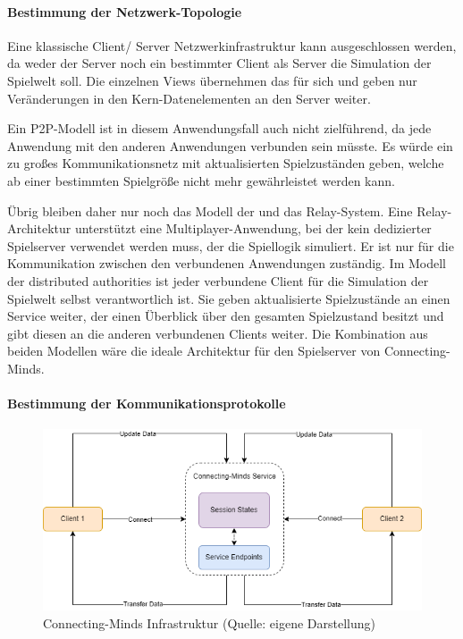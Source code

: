 \paragraph{Bestimmung der Netzwerk-Topologie}

Eine klassische Client/ Server Netzwerkinfrastruktur kann ausgeschlossen werden, da weder der Server noch ein bestimmter Client als Server die Simulation der Spielwelt soll. Die einzelnen Views übernehmen das für sich und geben nur Veränderungen in den Kern-Datenelementen an den Server weiter. 

Ein \ac{P2P}-Modell ist in diesem Anwendungsfall auch nicht zielführend, da jede Anwendung mit den anderen Anwendungen verbunden sein müsste. Es würde ein zu großes Kommunikationsnetz mit aktualisierten Spielzuständen geben, welche ab einer bestimmten Spielgröße nicht mehr gewährleistet werden kann. 

Übrig bleiben daher nur noch das Modell der  und das Relay-System. Eine Relay-Architektur unterstützt eine Multiplayer-Anwendung, bei der kein dedizierter Spielserver verwendet werden muss, der die Spiellogik simuliert. Er ist nur für die Kommunikation zwischen den verbundenen Anwendungen zuständig. Im Modell der distributed authorities ist jeder verbundene Client für die Simulation der Spielwelt selbst verantwortlich ist. Sie geben aktualisierte Spielzustände an einen Service weiter, der einen Überblick über den gesamten Spielzustand besitzt und gibt diesen an die anderen verbundenen Clients weiter. Die Kombination aus beiden Modellen wäre die ideale Architektur für den Spielserver von Connecting-Minds.

\paragraph{Bestimmung der Kommunikationsprotokolle}

\begin{figure}[ht]
\centering
\includegraphics[width=1\linewidth]{content/pictures/CM-Archticture.png}
\caption{Connecting-Minds Infrastruktur (Quelle: eigene Darstellung)}
\label{fig:cm-topology}
\end{figure}

